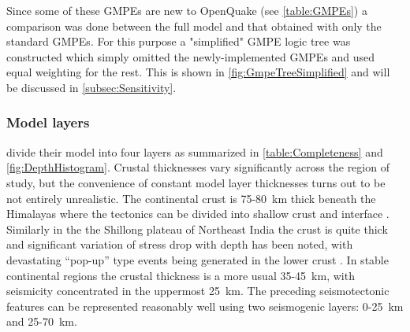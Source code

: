 \documentclass{article}
\begin{document}
Since some of these GMPEs are new to OpenQuake (see \autoref{table:GMPEs}) a comparison was done between the full model and that obtained with only the standard GMPEs.
For this purpose a "simplified" GMPE logic tree was constructed which simply omitted the newly-implemented GMPEs and used equal weighting for the rest. This is shown in \autoref{fig:GmpeTreeSimplified} and will be discussed in \autoref{subsec:Sensitivity}.

\subsubsection{Model layers}
\label{subsubsec:Layers}

\cite{thingbaijam2011seismogenic} divide their model into four layers as summarized in \autoref{table:Completeness} and \autoref{fig:DepthHistogram}.
Crustal thicknesses vary significantly across the region of study, but the convenience of constant model layer thicknesses turns out to be not entirely unrealistic.
The continental crust is 75-80~km thick beneath the Himalayas where the tectonics can be divided into shallow crust and interface \citep{thingbaijam2011seismogenic}.
Similarly in the the Shillong plateau of Northeast India the crust is quite thick and significant variation of stress drop with depth has been noted, with devastating ``pop-up'' type events \cite{bilham2001plateau} being generated in the lower crust \citep{nath2012ground}.
In stable continental regions the crustal thickness is a more usual 35-45~km, with seismicity concentrated in the uppermost 25~km.
The preceding seismotectonic features can be represented reasonably well using two seismogenic layers: 0-25~km and 25-70~km.
\end{document}

